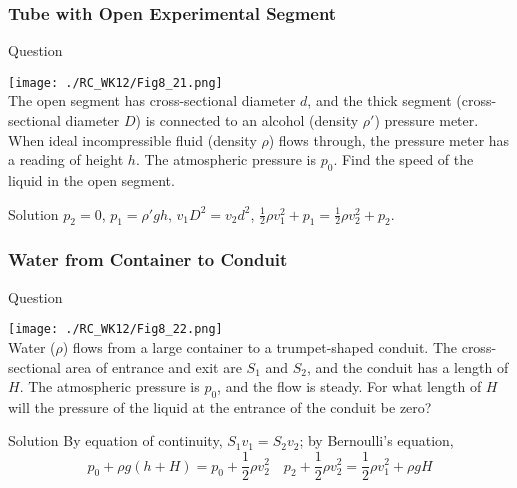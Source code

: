 \begin{frame}
\frametitle{Tube with Open Experimental Segment}
\begin{block}{Question}
\begin{multicols}{2}
\texttt{[image: ./RC\_WK12/Fig8\_21.png]}\\
The open segment has cross-sectional diameter $d$, and the thick segment (cross-sectional diameter $D$) is connected to an alcohol (density $\rho'$) pressure meter. When ideal incompressible fluid (density $\rho$) flows through, the pressure meter has a reading of height $h$. The atmospheric pressure is $p_0$. Find the speed of the liquid in the open segment.
\end{multicols}
\end{block}
\begin{block}{Solution}
$p_2=0$, $p_1=\rho'gh$, $v_1D^2=v_2d^2$, $\frac{1}{2}\rho v_1^2+p_1=\frac{1}{2}\rho v_2^2+p_2$.
\end{block}
\end{frame}
\begin{frame}
\frametitle{Water from Container to Conduit}
\begin{block}{Question}
\begin{multicols}{2}
\texttt{[image: ./RC\_WK12/Fig8\_22.png]}\\
Water ($\rho$) flows from a large container to a trumpet-shaped conduit. The cross-sectional area of entrance and exit are $S_1$ and $S_2$, and the conduit has a length of $H$. The atmospheric pressure is $p_0$, and the flow is steady. For what length of $H$ will the pressure of the liquid at the entrance of the conduit be zero?
\end{multicols}
\end{block}
\begin{block}{Solution}
By equation of continuity, $S_1v_1=S_2v_2$; by Bernoulli's equation,
\[p_0+\rho g(h+H)=p_0+\frac{1}{2}\rho v_2^2\quad
p_2+\frac{1}{2}\rho v_2^2=\frac{1}{2}\rho v_1^2+\rho gH\]
\end{block}
\end{frame}
